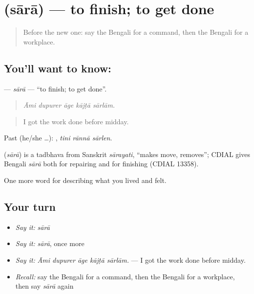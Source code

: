 \section[\texorpdfstring{\bn{সারা} (sārā)}{সারা (sārā)}]{ (sārā) — to finish; to get done}

\label{lesson:BN-C500-sara}



\begin{quote}
Before the new one: say the Bengali for a command, then the Bengali for a workplace.
\end{quote}

\subsection*{You'll want to know: }
\textbf{} — \emph{sārā} — \textquotedblleft{}to finish; to get done\textquotedblright{}.

\begin{quote}
    
\end{quote}

\begin{quote}
\emph{Āmi dupurer āge kājṭā sārlām.}
\end{quote}

\begin{quote}
I got the work done before midday.
\end{quote}

Past (he/she …):   , \emph{tini rānnā sārlen}.

\begin{cousinweb}
\textbf{} (\emph{sārā}) is a tadbhava from Sanskrit \emph{sārayati}, \textquotedblleft{}makes move, removes\textquotedblright{}; CDIAL gives Bengali \emph{sārā} both for repairing and for finishing (CDIAL 13358).
\end{cousinweb}

\begin{grammarlens}[title={What you've built}]
One more word for describing what you lived and felt.
\end{grammarlens}

\subsection*{Your turn}
\begin{itemize}
\raggedright
  \item \emph{Say it:} \emph{sārā}
  \item \emph{Say it:} \emph{sārā}, once more
  \item \emph{Say it:} \emph{Āmi dupurer āge kājṭā sārlām.} — I got the work done before midday.
  \item \emph{Recall:} say the Bengali for a command, then the Bengali for a workplace, then say \emph{sārā} again
\end{itemize}

